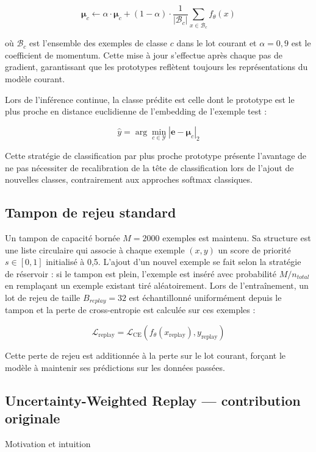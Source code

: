 $$\boldsymbol{\mu}_c \leftarrow \alpha \cdot \boldsymbol{\mu}_c + (1 - \alpha) \cdot \frac{1}{|\mathcal{B}_c|} \sum_{x \in \mathcal{B}_c} f_\theta(x)$$

où $\mathcal{B}_c$ est l'ensemble des exemples de classe $c$ dans le lot courant et $\alpha = 0{,}9$ est le coefficient de momentum. Cette mise à jour s'effectue après chaque pas de gradient, garantissant que les prototypes reflètent toujours les représentations du modèle courant.

Lors de l'inférence continue, la classe prédite est celle dont le prototype est le plus proche en distance euclidienne de l'embedding de l'exemple test :

$$\hat{y} = \arg\min_{c \in \mathcal{Y}} |\boldsymbol{e} - \boldsymbol{\mu}_c|_2$$

Cette stratégie de classification par plus proche prototype présente l'avantage de ne pas nécessiter de recalibration de la tête de classification lors de l'ajout de nouvelles classes, contrairement aux approches softmax classiques.

\subsection{Tampon de rejeu standard}

Un tampon de capacité bornée $M = 2000$ exemples est maintenu. Sa structure est une liste circulaire qui associe à chaque exemple $(x, y)$ un score de priorité $s \in [0, 1]$ initialisé à 0,5. L'ajout d'un nouvel exemple se fait selon la stratégie de réservoir : si le tampon est plein, l'exemple est inséré avec probabilité $M / n_{total}$ en remplaçant un exemple existant tiré aléatoirement. Lors de l'entraînement, un lot de rejeu de taille $B_{replay} = 32$ est échantillonné uniformément depuis le tampon et la perte de cross-entropie est calculée sur ces exemples :

$$\mathcal{L}_{\mathrm{replay}} = \mathcal{L}_{\mathrm{CE}}(f_\theta(x_{\mathrm{replay}}), y_{\mathrm{replay}})$$

Cette perte de rejeu est additionnée à la perte sur le lot courant, forçant le modèle à maintenir ses prédictions sur les données passées.

\subsection{Uncertainty-Weighted Replay — contribution originale}

Motivation et intuition

